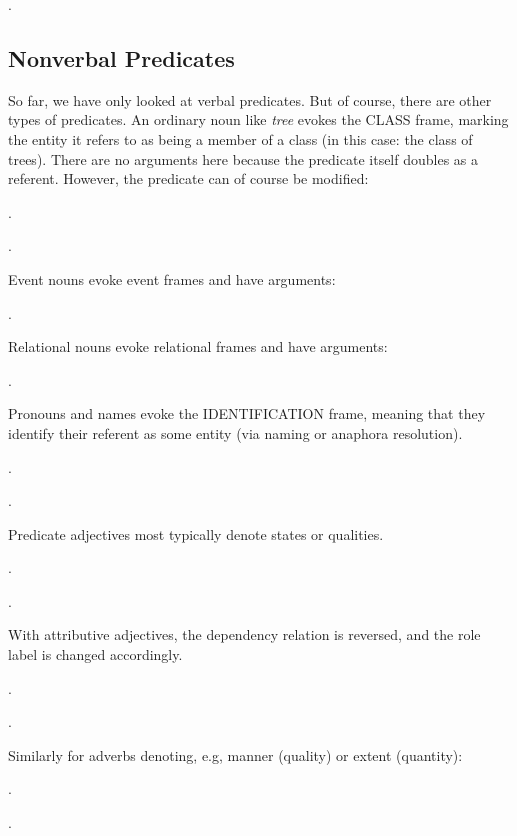 \documentclass[a4paper]{article}
\newcommand{\fr}[1]{\textsf{#1}}
\newcommand{\rl}[1]{\textsf{#1}}
\begin{document}
\ex.

\newpage\subsection{Nonverbal Predicates}

So far, we have only looked at verbal predicates. But of course, there are
other types of predicates. An ordinary noun like \emph{tree} evokes the
\fr{CLASS} frame, marking the entity it refers to as being a member of a class
(in this case: the class of trees). There are no arguments here because the
predicate itself doubles as a referent. However, the predicate can of course be
modified:

\ex.

\ex.

Event nouns evoke event frames and have arguments:

\ex.

Relational nouns evoke relational frames and have arguments:

\ex.

Pronouns and names evoke the \fr{IDENTIFICATION} frame, meaning that they
identify their referent as some entity (via naming or anaphora resolution).

\ex.

\ex.

Predicate adjectives most typically denote states or qualities.

\ex.

\ex.

With attributive adjectives, the dependency relation is reversed, and the role label is changed accordingly.

\ex.

\ex.

Similarly for adverbs denoting, e.g, manner (\rl{quality}) or extent (\rl{quantity}):

\ex.

\ex.
\end{document}

